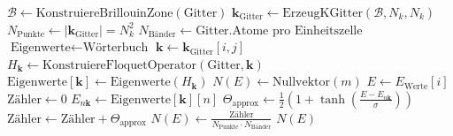 \documentclass[a4paper,12pt]{article}
\theoremstyle{definition}
\begin{document}
\begin{algorithm}[h]
	\caption{Berechnung der integrierten Zustandsdichte (IDS)}
	\label{algo:ids_computation}
	
	\begin{algorithmic}[1]
		\State $\mathcal{B} \gets \text{KonstruiereBrillouinZone}(\text{Gitter})$
		\State $\mathbf{k}_{\text{Gitter}} \gets \text{ErzeugKGitter}(\mathcal{B}, N_k, N_k)$ 
		\State $N_{\text{Punkte}} \gets |\mathbf{k}_{\text{Gitter}}| = N_k^2$
		\State $N_{\text{Bänder}} \gets \text{Gitter}.\text{Atome pro Einheitszelle}$
		\State $\text{Eigenwerte} \gets \text{Wörterbuch}$
				\State $\mathbf{k} \gets \mathbf{k}_{\text{Gitter}}[i, j]$ 
				\State $H_{\mathbf{k}} \gets \text{KonstruiereFloquetOperator}(\text{Gitter}, \mathbf{k})$ 
				\State $\text{Eigenwerte}[\mathbf{k}] \gets \text{Eigenwerte}(H_{\mathbf{k}})$ 
			\EndFor
		\EndFor
		\State $N(E) \gets \text{Nullvektor}(m)$ 
			\State $E \gets E_{\text{Werte}}[i]$
			\State $\text{Zähler} \gets 0$
					\State $E_{n\mathbf{k}} \gets \text{Eigenwerte}[\mathbf{k}][n]$
					\State $\Theta_{\text{approx}} \gets \frac{1}{2} \left(1 + \tanh\left(\frac{E - E_{n\mathbf{k}}}{\sigma}\right)\right)$
					\State $\text{Zähler} \gets \text{Zähler} + \Theta_{\text{approx}}$
				\EndFor
			\EndFor
			\State $N(E) \gets \frac{\text{Zähler}}{N_{\text{Punkte}} \cdot N_{\text{Bänder}}}$
		\EndFor
		\State \Return $N(E)$ 
	\end{algorithmic}
\end{algorithm}
 
\end{document}
